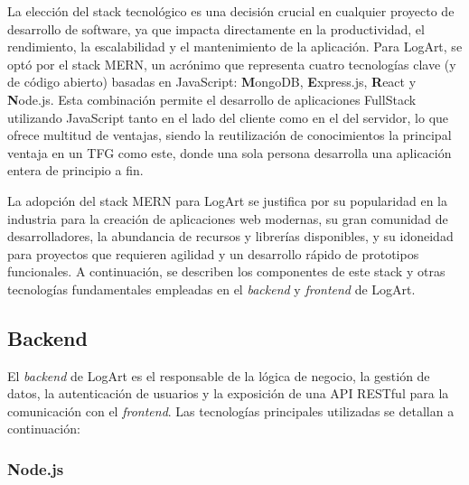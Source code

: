 La elección del stack tecnológico es una decisión crucial en cualquier proyecto de desarrollo de software, ya que impacta directamente en la productividad, el rendimiento, la escalabilidad y el mantenimiento de la aplicación. Para LogArt, se optó por el stack MERN, un acrónimo que representa cuatro tecnologías clave (y de código abierto) basadas en JavaScript: \textbf{M}ongoDB, \textbf{E}xpress.js, \textbf{R}eact y \textbf{N}ode.js. Esta combinación permite el desarrollo de aplicaciones FullStack utilizando JavaScript tanto en el lado del cliente como en el del servidor, lo que ofrece multitud de ventajas\cite{adityabhuyanMERNAdvantages}, siendo la reutilización de conocimientos la principal ventaja en un TFG como este, donde una sola persona desarrolla una aplicación entera de principio a fin.

La adopción del stack MERN para LogArt se justifica por su popularidad en la industria para la creación de aplicaciones web modernas, su gran comunidad de desarrolladores, la abundancia de recursos y librerías disponibles, y su idoneidad para proyectos que requieren agilidad y un desarrollo rápido de prototipos funcionales. A continuación, se describen los componentes de este stack y otras tecnologías fundamentales empleadas en el \textit{backend} y \textit{frontend} de LogArt.

\subsection{Backend}
\label{sec:backendTech}

El \textit{backend} de LogArt es el responsable de la lógica de negocio, la gestión de datos, la autenticación de usuarios y la exposición de una API RESTful para la comunicación con el \textit{frontend}. Las tecnologías principales utilizadas se detallan a continuación:

\subsubsection{Node.js}
\label{sec:nodejs}

